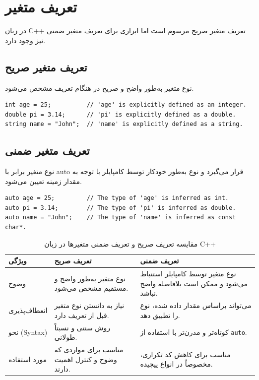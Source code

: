 \documentclass{article}
\begin{document}
\section*{تعریف متغیر}
در زبان C++ تعریف متغیر صریح مرسوم است اما ابزاری برای تعریف متغیر ضمنی نیز وجود دارد.

\subsection*{تعریف متغیر صریح}
نوع متغیر به‌طور واضح و صریح در هنگام تعریف مشخص می‌شود.

\begin{LTR} %
\begin{lstlisting}
int age = 25;          // 'age' is explicitly defined as an integer.
double pi = 3.14;      // 'pi' is explicitly defined as a double.
string name = "John";  // 'name' is explicitly defined as a string.
\end{lstlisting}
\end{LTR}

\subsection*{تعریف متغیر ضمنی}
نوع متغیر برابر با auto قرار می‌گیرد و نوع به‌طور خودکار توسط کامپایلر با توجه به مقدار زمینه تعیین می‌شود.

\begin{LTR} %
\begin{lstlisting}
auto age = 25;         // The type of 'age' is inferred as int.
auto pi = 3.14;        // The type of 'pi' is inferred as double.
auto name = "John";    // The type of 'name' is inferred as const char*.
\end{lstlisting}
\end{LTR}

\begin{table}[h!]
    \centering
    \begin{tabular}{|p{3cm}|p{5cm}|p{5cm}|}
        \hline
        \textbf{ویژگی} & \textbf{تعریف صریح} & \textbf{تعریف ضمنی} \\
        \hline
        وضوح & 
        نوع متغیر به‌طور واضح و مستقیم مشخص می‌شود. & 
        نوع متغیر توسط کامپایلر استنباط می‌شود و ممکن است بلافاصله واضح نباشد. \\
        \hline
        انعطاف‌پذیری & 
        نیاز به دانستن نوع متغیر قبل از تعریف دارد. & 
        می‌تواند براساس مقدار داده شده، نوع را تطبیق دهد. \\
        \hline
        نحو (Syntax) & 
        روش سنتی و نسبتاً طولانی. & 
        کوتاه‌تر و مدرن‌تر با استفاده از \texttt{auto}. \\
        \hline
        مورد استفاده & 
        مناسب برای مواردی که وضوح و کنترل اهمیت دارند. & 
        مناسب برای کاهش کد تکراری، مخصوصاً در انواع پیچیده. \\
        \hline
    \end{tabular}
    \caption{مقایسه تعریف صریح و تعریف ضمنی متغیرها در زبان C++}
    \label{tab:explicit_implicit}
\end{table}
\end{document}
